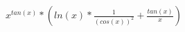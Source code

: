 \documentclass[32pt]{article}
\begin{document}
$x^{tan(x)}*(ln(x)*\frac{1}{(cos(x))^{2}}+\frac{tan(x)}{x})$
\end{document}
